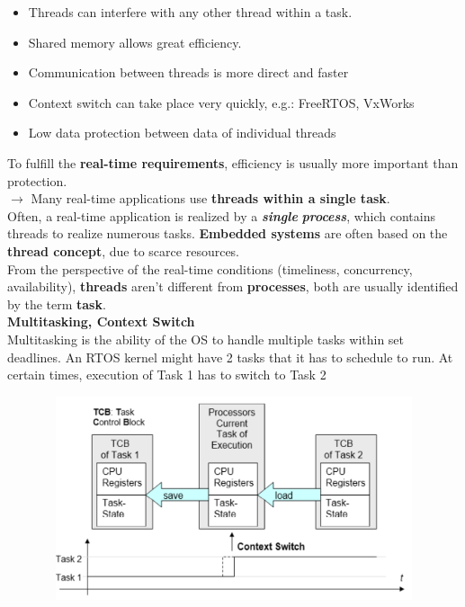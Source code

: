 \begin{itemize}
	\item Threads can interfere with any other thread within a task.
	\item Shared memory allows great efficiency.
	\item Communication between threads is more direct and faster
	\item Context switch can take place very quickly, e.g.: FreeRTOS, VxWorks
	\item Low data protection between data of individual threads
\end{itemize}

To fulfill the \textbf{real-time requirements}, efficiency is usually more important than protection. \\

$\rightarrow$ Many real-time applications use \textbf{threads within a single task}.\\

Often, a real-time application is realized by a \textbf{\textit{single}} \textbf{\textit{process}}, which contains threads to realize numerous tasks.\textbf{ Embedded systems} are often based on the \textbf{thread concept}, due to scarce resources.\\

From the perspective of the real-time conditions (timeliness, concurrency, availability), \textbf{threads} aren't different from \textbf{processes}, both are usually identified by the term \textbf{task}.\\

{\rot\bf Multitasking, Context Switch }\\

Multitasking is the ability of the OS to handle multiple tasks within set deadlines. An RTOS kernel might have 2 tasks that it has to schedule to run. At certain times, execution of Task 1 has to switch to Task 2

	\begin{figure}[h]
    \centering
    \includegraphics[width=13cm, height=6cm]{Images/image81.png}
    \label{fig:Fig 27}
    \end{figure}


